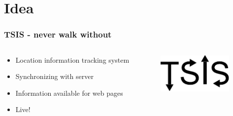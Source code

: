 \section{Idea}
\label{sec:idea}

\begin{frame}
  \frametitle{TSIS - never walk without}
  \begin{columns}[onlytextwidth]
    \begin{column}{0.5\textwidth}
      \begin{itemize}
      \item Location information tracking system
      \item Synchronizing with server
      \item Information available for web pages
      \item Live!
      \end{itemize}
    \end{column}
    \begin{column}{0.5\textwidth}
      \begin{center}
        \includegraphics[width=0.75\textwidth]{images/logo_tsis.pdf}
      \end{center}
    \end{column}
  \end{columns}
\end{frame}
